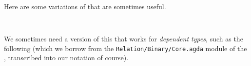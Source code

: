 \ccpad
Here are some variations of  that are sometimes useful.
\ccpad
\begin{code}%
\>[0]\AgdaSpace{}%
\AgdaSymbol{:}%
\>[100I]\AgdaSymbol{\{}\AgdaSpace{}%
\AgdaSymbol{:}\AgdaSpace{}%
\AgdaSpace{}%
\AgdaSpace{}%
\AgdaSymbol{\}\{}\AgdaSpace{}%
\AgdaSymbol{:}\AgdaSpace{}%
\AgdaSpace{}%
\AgdaSpace{}%
\AgdaSymbol{\}\{}\AgdaSpace{}%
\AgdaSpace{}%
\AgdaSymbol{:}\AgdaSpace{}%
\AgdaSpace{}%
\AgdaSpace{}%
\AgdaSymbol{\}}\AgdaSpace{}%
\AgdaSymbol{\{}\AgdaSpace{}%
\AgdaSpace{}%
\AgdaSymbol{:}\AgdaSpace{}%
\AgdaSymbol{\}}\AgdaSpace{}%
\AgdaSpace{}%
\AgdaSpace{}%
\AgdaSpace{}%
\AgdaSpace{}%
\AgdaSpace{}%
\AgdaSpace{}%
\AgdaSpace{}%
\AgdaSpace{}%
\AgdaSpace{}%
\AgdaSpace{}%
\AgdaSpace{}%
\AgdaSpace{}%
\AgdaSpace{}%
\<%
\\
%
\>[0]\AgdaSpace{}%
\AgdaSpace{}%
\AgdaSpace{}%
\AgdaSymbol{=}\AgdaSpace{}%
\<%
\end{code}
\ccpad
We sometimes need a version of this that works for \textit{dependent types}, such as the following (which we borrow from the \texttt{Relation/Binary/Core.agda} module of the \agdastdlib, transcribed into our notation of course).
\ccpad
